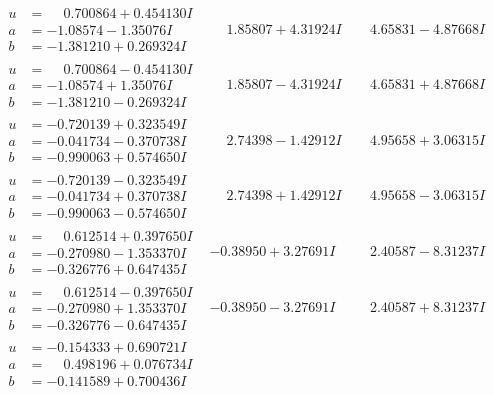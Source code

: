 \documentclass[1p]{elsarticle_modified}
\theoremstyle{definition}
\begin{document}
$$\begin{array}{c|c|c}
\begin{aligned}
u &= \phantom{-}0.700864 + 0.454130 I \\
a &= -1.08574 - 1.35076 I \\
b &= -1.381210 + 0.269324 I\end{aligned}
 & \phantom{-}1.85807 + 4.31924 I & \phantom{-}4.65831 - 4.87668 I \\ \hline\begin{aligned}
u &= \phantom{-}0.700864 - 0.454130 I \\
a &= -1.08574 + 1.35076 I \\
b &= -1.381210 - 0.269324 I\end{aligned}
 & \phantom{-}1.85807 - 4.31924 I & \phantom{-}4.65831 + 4.87668 I \\ \hline\begin{aligned}
u &= -0.720139 + 0.323549 I \\
a &= -0.041734 - 0.370738 I \\
b &= -0.990063 + 0.574650 I\end{aligned}
 & \phantom{-}2.74398 - 1.42912 I & \phantom{-}4.95658 + 3.06315 I \\ \hline\begin{aligned}
u &= -0.720139 - 0.323549 I \\
a &= -0.041734 + 0.370738 I \\
b &= -0.990063 - 0.574650 I\end{aligned}
 & \phantom{-}2.74398 + 1.42912 I & \phantom{-}4.95658 - 3.06315 I \\ \hline\begin{aligned}
u &= \phantom{-}0.612514 + 0.397650 I \\
a &= -0.270980 - 1.353370 I \\
b &= -0.326776 + 0.647435 I\end{aligned}
 & -0.38950 + 3.27691 I & \phantom{-}2.40587 - 8.31237 I \\ \hline\begin{aligned}
u &= \phantom{-}0.612514 - 0.397650 I \\
a &= -0.270980 + 1.353370 I \\
b &= -0.326776 - 0.647435 I\end{aligned}
 & -0.38950 - 3.27691 I & \phantom{-}2.40587 + 8.31237 I \\ \hline\begin{aligned}
u &= -0.154333 + 0.690721 I \\
a &= \phantom{-}0.498196 + 0.076734 I \\
b &= -0.141589 + 0.700436 I\end{aligned}

\end{array}$$
\end{document}

